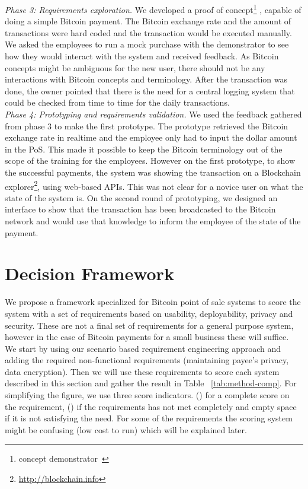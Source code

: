 \textit{Phase 3: Requirements exploration.}
We developed a proof of concept\footnote{concept demonstrator~\cite{REScenario}} , capable of doing a simple Bitcoin payment. The Bitcoin exchange rate and the amount of transactions were hard coded and the transaction would be executed manually. We asked the employees to run a mock purchase with the demonstrator to see how they would interact with the system and received feedback. As Bitcoin concepts might be ambiguous for the new user, there should not be any interactions with Bitcoin concepts and terminology. After the transaction was done, the owner pointed that there is the need for a central logging system that could be checked from time to time for the daily transactions.\\


\textit{Phase 4: Prototyping and requirements validation.}
We used the feedback gathered from phase 3 to make the first prototype. The prototype retrieved the Bitcoin exchange rate in realtime and the employee only had to input the dollar amount in the PoS. This made it possible to keep the Bitcoin terminology out of the scope of the training for the employees. However on the first prototype, to show the successful payments, the system was showing the transaction on a Blockchain explorer\footnote{\url{http://blockchain.info}}, using web-based APIs. This was not clear for a novice user on what the state of the system is. On the second round of prototyping, we designed an interface to show that the transaction has been broadcasted to the Bitcoin network and would use that knowledge to inform the employee of the state of the payment.\\

\section{Decision Framework}
We propose a framework specialized for Bitcoin point of sale systems to score the system with a set of requirements based on usability, deployability, privacy and security. These are not a final set of requirements for a general purpose system, however in the case of Bitcoin payments for a small business these will suffice.\\
We start by using our scenario based requirement engineering approach and adding the required non-functional requirements (\eg maintaining payee's privacy, data encryption). Then we will use these requirements to score each system described in this section and gather the result in Table ~\ref{tab:method-comp}. For simplifying the figure, we use three score indicators. (\full) for a complete score on the requirement, (\prt) if the requirements has not met completely and empty space if it is not satisfying the need. For some of the requirements the scoring system might be confusing (\eg low cost to run) which will be explained later.


